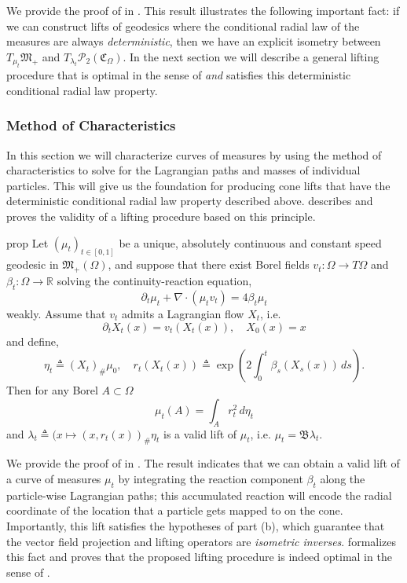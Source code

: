 \documentclass[11pt]{article}
\begin{document}
We provide the proof of  in . This result illustrates the following important fact: if we can construct lifts of geodesics where the conditional radial law of the measures are always \textit{deterministic}, then we have an explicit isometry between $T_{\mu_t}\mathfrak{M}_+$ and $T_{\lambda_t}\mathcal{P}_2(\mathfrak{C}_\Omega)$. In the next section we will describe a general lifting procedure that is optimal in the sense of  \textit{and} satisfies this deterministic conditional radial law property.

\subsubsection{Method of Characteristics}

In this section we will characterize curves of measures by using the method of characteristics to solve for the Lagrangian paths and masses of individual particles. This will give us the foundation for producing cone lifts that have the deterministic conditional radial law property described above.  describes and proves the validity of a lifting procedure based on this principle. 

\begin{restatable}{prop}{} \label{lifting by characteristics one}
    Let $(\mu_t)_{t \in [0,1]}$ be a unique, absolutely continuous and constant speed geodesic in $\mathfrak{M}_+(\Omega)$, and suppose that there exist Borel fields $v_t: \Omega \rightarrow T\Omega$ and $\beta_t: \Omega \rightarrow \mathbb{R}$ solving the continuity-reaction equation,
    \[\partial_t \mu_t + \nabla \cdot(\mu_tv_t) = 4\beta_t \mu_t\]
    weakly. Assume that $v_t$ admits a Lagrangian flow $X_t$, i.e.
    \[\partial_t X_t(x) = v_t(X_t(x)), \quad X_0(x) = x\]
    and define,
    \[\eta_t \triangleq (X_t)_\# \mu_0, \quad r_t(X_t(x)) \triangleq \exp\left(2 \int_0^t \beta_s(X_s(x))\,ds\right).\]
    Then for any Borel $A \subset \Omega$
    \[\mu_t(A) = \int_A r_t^2 \, d\eta_t\]
    and $\lambda_t \triangleq (x \mapsto (x, r_t(x))_\#\eta_t$ is a valid lift of $\mu_t$, i.e. $\mu_t = \mathfrak{B}\lambda_t$. 
\end{restatable}
We provide the proof of  in . The result indicates that we can obtain a valid lift of a curve of measures $\mu_t$ by integrating the reaction component $\beta_t$ along the particle-wise Lagrangian paths; this accumulated reaction will encode the radial coordinate of the location that a particle gets mapped to on the cone. Importantly, this lift satisfies the hypotheses of  part (b), which guarantee that the vector field projection and lifting operators are \textit{isometric inverses}.  formalizes this fact and proves that the proposed lifting procedure is indeed optimal in the sense of . 
\end{document}
